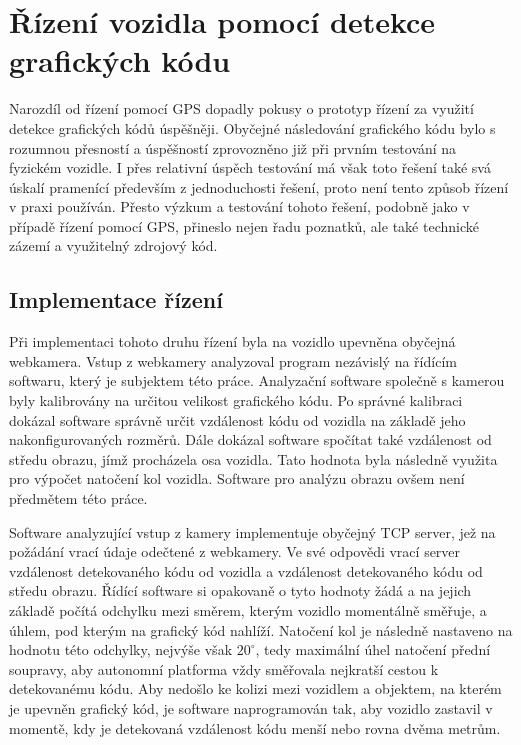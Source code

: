 \documentclass[czech, bachelor]{diploma}
\begin{document}
\section{Řízení vozidla pomocí detekce grafických kódu}

Narozdíl od řízení pomocí GPS dopadly pokusy o prototyp řízení za využití detekce grafických kódů úspěšněji. Obyčejné následování
grafického kódu bylo s rozumnou přesností a úspěšností zprovozněno již při prvním testování na fyzickém vozidle. I přes relativní
úspěch testování má však toto řešení také svá úskalí pramenící především z jednoduchosti řešení, proto není tento způsob řízení
v praxi používán. Přesto výzkum a testování tohoto řešení, podobně jako v případě řízení pomocí GPS, přineslo nejen řadu poznatků,
ale také technické zázemí a využitelný zdrojový kód.

\subsection{Implementace řízení}

Při implementaci tohoto druhu řízení byla na vozidlo upevněna obyčejná webkamera. Vstup z webkamery analyzoval program nezávislý
na řídícím softwaru, který je subjektem této práce. Analyzační software společně s kamerou byly kalibrovány na určitou velikost
grafického kódu. Po správné kalibraci dokázal software správně určit vzdálenost kódu od vozidla na základě jeho nakonfigurovaných
rozměrů. Dále dokázal software spočítat také vzdálenost od středu obrazu, jímž procházela osa vozidla. Tato hodnota byla následně
využita pro výpočet natočení kol vozidla. Software pro analýzu obrazu ovšem není předmětem této práce.

Software analyzující vstup z kamery implementuje obyčejný TCP server, jež na požádání vrací údaje odečtené z webkamery. Ve své
odpovědi vrací server vzdálenost detekovaného kódu od vozidla a vzdálenost detekovaného kódu od středu obrazu.  Řídící software si
opakovaně o tyto hodnoty žádá a na jejich základě počítá odchylku mezi směrem, kterým vozidlo momentálně směřuje, a úhlem,
pod kterým na grafický kód nahlíží. Natočení kol je následně nastaveno na hodnotu této odchylky, nejvýše však $20^{\circ}$, tedy
maximální úhel natočení přední soupravy, aby autonomní platforma vždy směřovala nejkratší cestou k detekovanému kódu. Aby nedošlo
ke kolizi mezi vozidlem a objektem, na kterém je upevněn grafický kód, je software naprogramován tak, aby vozidlo zastavil
v momentě, kdy je detekovaná vzdálenost kódu menší nebo rovna dvěma metrům.
\end{document}
